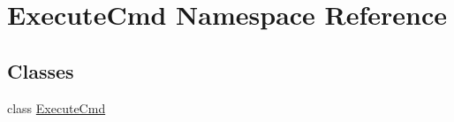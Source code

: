 \hypertarget{namespace_execute_cmd}{\section{Execute\-Cmd Namespace Reference}
\label{namespace_execute_cmd}
}
\subsection*{Classes}
\begin{DoxyCompactItemize}
\item 
class \hyperlink{class_execute_cmd_1_1_execute_cmd}{Execute\-Cmd}
\end{DoxyCompactItemize}
